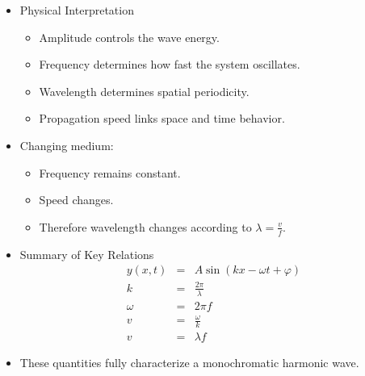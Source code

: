 \documentclass[t,aspectratio=169]{beamer}
\begin{document}
\begin{frame}
\begin{itemize}
  
\pagebreak
\item Physical Interpretation
\begin{itemize}
    \item Amplitude controls the wave energy.
    \item Frequency determines how fast the system oscillates.
    \item Wavelength determines spatial periodicity.
    \item Propagation speed links space and time behavior.
\end{itemize}
\item Changing medium:
\begin{itemize}
    \item Frequency remains constant.
    \item Speed changes.
    \item Therefore wavelength changes according to $ \lambda = \frac{v}{f} $.
\end{itemize}
\item Summary of Key Relations
\begin{eqnarray*}
y\left(x,t\right) &=& A \sin\left(kx - \omega t + \varphi\right) \\
k &=& \frac{2\pi}{\lambda} \\
\omega &=& 2\pi f\\
  v &=& \frac{\omega}{k}\\
  v &=& \lambda f
\end{eqnarray*}
\item These quantities fully characterize a monochromatic harmonic wave.

\end{itemize}

\end{frame}

\end{document}
